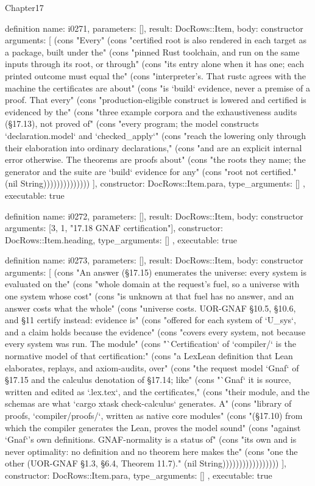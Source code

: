 \begin{lexlean}{Chapter17}
\begin{semanticmodule}
definition{
  name: i0271,
  parameters: [],
  result: DocRows::Item,
  body: constructor{
    arguments: [
      (cons "Every" (cons "certified root is also rendered in each target as a package, built under the" (cons "pinned Rust toolchain, and run on the same inputs through its root, or through" (cons "its entry alone when it has one; each printed outcome must equal the" (cons "interpreter's. That rustc agrees with the machine the certificates are about" (cons "is `build` evidence, never a premise of a proof. That every" (cons "production-eligible construct is lowered and certified is evidenced by the" (cons "three example corpora and the exhaustiveness audits (§17.13), not proved of" (cons "every program; the model constructs `declaration.model` and `checked_apply`" (cons "reach the lowering only through their elaboration into ordinary declarations," (cons "and are an explicit internal error otherwise. The theorems are proofs about" (cons "the roots they name; the generator and the suite are `build` evidence for any" (cons "root not certified." (nil String))))))))))))))
    ],
    constructor: DocRows::Item.para,
    type_arguments: []
  },
  executable: true
}

definition{
  name: i0272,
  parameters: [],
  result: DocRows::Item,
  body: constructor{
    arguments: [3, 1, "17.18 GNAF certification"],
    constructor: DocRows::Item.heading,
    type_arguments: []
  },
  executable: true
}

definition{
  name: i0273,
  parameters: [],
  result: DocRows::Item,
  body: constructor{
    arguments: [
      (cons "An answer (§17.15) enumerates the universe: every system is evaluated on the" (cons "whole domain at the request's fuel, so a universe with one system whose cost" (cons "is unknown at that fuel has no answer, and an answer costs what the whole" (cons "universe costs. UOR-GNAF §10.5, §10.6, and §11 certify instead: evidence is" (cons "offered for each system of `U_sys`, and a claim holds because the evidence" (cons "covers every system, not because every system was run. The module" (cons "`Certification` of `compiler/` is the normative model of that certification:" (cons "a LexLean definition that Lean elaborates, replays, and axiom-audits, over" (cons "the request model `Gnaf` of §17.15 and the calculus denotation of §17.14; like" (cons "`Gnaf` it is source, written and edited as `.lex.tex`, and the certificates," (cons "their module, and the schemas are what `cargo xtask check-calculus` generates. A" (cons "library of proofs, `compiler/proofs/`, written as native core modules" (cons "(§17.10) from which the compiler generates the Lean, proves the model sound" (cons "against `Gnaf`'s own definitions. GNAF-normality is a status of" (cons "its own and is never optimality: no definition and no theorem here makes the" (cons "one the other (UOR-GNAF §1.3, §6.4, Theorem 11.7)." (nil String)))))))))))))))))
    ],
    constructor: DocRows::Item.para,
    type_arguments: []
  },
  executable: true
}


\end{semanticmodule}
\end{lexlean}
